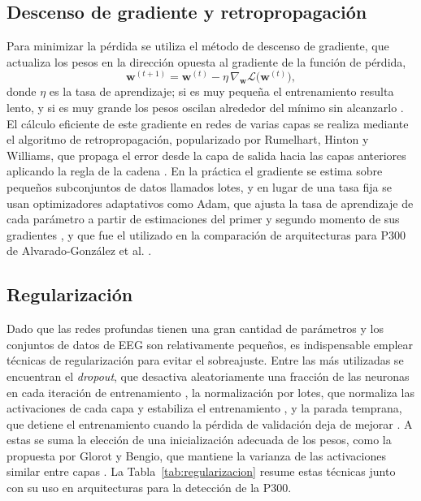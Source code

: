 \subsection{Descenso de gradiente y retropropagación}

Para minimizar la pérdida se utiliza el método de descenso de gradiente, que actualiza los pesos
en la dirección opuesta al gradiente de la función de pérdida,
\begin{equation}
\mathbf{w}^{(t+1)} = \mathbf{w}^{(t)} - \eta\, \nabla_{\mathbf{w}}\mathcal{L}\big(\mathbf{w}^{(t)}\big),
\label{eq:gradiente}
\end{equation}
donde $\eta$ es la tasa de aprendizaje; si es muy pequeña el entrenamiento resulta lento, y si es
muy grande los pesos oscilan alrededor del mínimo sin alcanzarlo \cite{goodfellow2016}. El cálculo
eficiente de este gradiente en redes de varias capas se realiza mediante el algoritmo de
retropropagación, popularizado por Rumelhart, Hinton y Williams, que propaga el error desde la capa
de salida hacia las capas anteriores aplicando la regla de la cadena \cite{rumelhart1986}. En la
práctica el gradiente se estima sobre pequeños subconjuntos de datos llamados lotes, y en lugar de
una tasa fija se usan optimizadores adaptativos como Adam, que ajusta la tasa de aprendizaje de
cada parámetro a partir de estimaciones del primer y segundo momento de sus gradientes
\cite{kingma2015}, y que fue el utilizado en la comparación de arquitecturas para P300 de
Alvarado-González et al. \cite{alvarado2021}.

\subsection{Regularización}

Dado que las redes profundas tienen una gran cantidad de parámetros y los conjuntos de datos de EEG
son relativamente pequeños, es indispensable emplear técnicas de regularización para evitar el
sobreajuste. Entre las más utilizadas se encuentran el \textit{dropout}, que desactiva
aleatoriamente una fracción de las neuronas en cada iteración de entrenamiento
\cite{srivastava2014}, la normalización por lotes, que normaliza las activaciones de cada capa y
estabiliza el entrenamiento \cite{ioffe2015}, y la parada temprana, que detiene el entrenamiento
cuando la pérdida de validación deja de mejorar \cite{goodfellow2016}. A estas se suma la elección
de una inicialización adecuada de los pesos, como la propuesta por Glorot y Bengio, que mantiene la
varianza de las activaciones similar entre capas \cite{glorot2010}. La Tabla~\ref{tab:regularizacion}
resume estas técnicas junto con su uso en arquitecturas para la detección de la P300.

